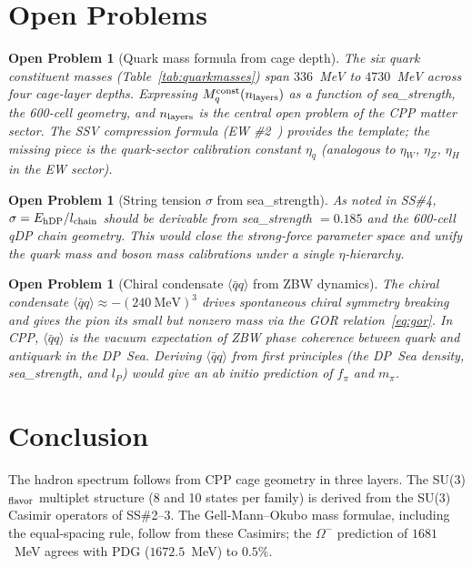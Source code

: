 \documentclass[11pt,a4paper]{article}
\newtheorem{openprob}[theorem]{Open Problem}
\newcommand{\lP}{l_P}
\newcommand{\qqbar}{\langle\bar{q}q\rangle}
\begin{document}
\section{Open Problems}

\begin{openprob}[Quark mass formula from cage depth]
\label{op:mq}
The six quark constituent masses (Table~\ref{tab:quarkmasses}) span
$336$~MeV to $4730$~MeV across four cage-layer depths.  Expressing
$M_q^{\rm const}(n_{\rm layers})$ as a function of sea\_strength,
the 600-cell geometry, and $n_{\rm layers}$ is the central open
problem of the CPP matter sector.  The SSV compression formula
(EW \#2~\citep{cpp_ew2}) provides the template; the missing piece
is the quark-sector calibration constant $\eta_q$ (analogous to
$\eta_W$, $\eta_Z$, $\eta_H$ in the EW sector).
\end{openprob}

\begin{openprob}[String tension $\sigma$ from sea\_strength]
\label{op:sigma}
As noted in SS\#4, $\sigma = E_{\rm hDP}/l_{\rm chain}$ should be
derivable from sea\_strength $= 0.185$ and the 600-cell qDP chain
geometry.  This would close the strong-force parameter space
and unify the quark mass and boson mass calibrations under a single
$\eta$-hierarchy.
\end{openprob}

\begin{openprob}[Chiral condensate $\qqbar$ from ZBW dynamics]
\label{op:qqbar}
The chiral condensate $\qqbar \approx -(240\ \text{MeV})^3$ drives
spontaneous chiral symmetry breaking and gives the pion its small
but nonzero mass via the GOR relation~\eqref{eq:gor}.  In CPP,
$\qqbar$ is the vacuum expectation of ZBW phase coherence between
quark and antiquark in the DP~Sea.  Deriving $\qqbar$ from first
principles (the DP~Sea density, sea\_strength, and $\lP$) would
give an ab initio prediction of $f_\pi$ and $m_\pi$.
\end{openprob}

\section{Conclusion}

The hadron spectrum follows from CPP cage geometry in three layers.
The SU(3)$_{\rm flavor}$ multiplet structure (8 and 10 states per
family) is derived from the SU(3) Casimir operators of SS\#2--3.
The Gell-Mann--Okubo mass formulae, including the equal-spacing
rule, follow from these Casimirs; the $\Omega^-$ prediction of
$1681$~MeV agrees with PDG ($1672.5$~MeV) to $0.5\%$.
\end{document}
